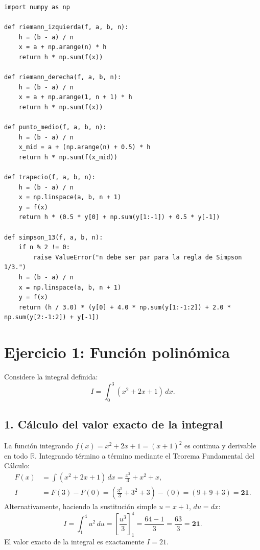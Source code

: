 \documentclass[11pt,a4paper]{article}
\begin{document}
\begin{lstlisting}
import numpy as np

def riemann_izquierda(f, a, b, n):
    h = (b - a) / n
    x = a + np.arange(n) * h
    return h * np.sum(f(x))

def riemann_derecha(f, a, b, n):
    h = (b - a) / n
    x = a + np.arange(1, n + 1) * h
    return h * np.sum(f(x))

def punto_medio(f, a, b, n):
    h = (b - a) / n
    x_mid = a + (np.arange(n) + 0.5) * h
    return h * np.sum(f(x_mid))

def trapecio(f, a, b, n):
    h = (b - a) / n
    x = np.linspace(a, b, n + 1)
    y = f(x)
    return h * (0.5 * y[0] + np.sum(y[1:-1]) + 0.5 * y[-1])

def simpson_13(f, a, b, n):
    if n % 2 != 0:
        raise ValueError("n debe ser par para la regla de Simpson 1/3.")
    h = (b - a) / n
    x = np.linspace(a, b, n + 1)
    y = f(x)
    return (h / 3.0) * (y[0] + 4.0 * np.sum(y[1:-1:2]) + 2.0 * np.sum(y[2:-1:2]) + y[-1])
\end{lstlisting}

\section{Ejercicio 1: Función polinómica}

Considere la integral definida:
\begin{equation}
    I = \int_0^3 (x^2 + 2x + 1)\, dx.
\end{equation}

\subsection{1. Cálculo del valor exacto de la integral}
La función integrando $f(x) = x^2 + 2x + 1 = (x+1)^2$ es continua y derivable en todo $\mathbb{R}$. Integrando término a término mediante el Teorema Fundamental del Cálculo:
\begin{align}
    F(x) &= \int (x^2 + 2x + 1)\, dx = \frac{x^3}{3} + x^2 + x, \\
    I &= F(3) - F(0) = \left( \frac{3^3}{3} + 3^2 + 3 \right) - (0) = \left( 9 + 9 + 3 \right) = \mathbf{21}.
\end{align}
Alternativamente, haciendo la sustitución simple $u = x+1$, $du = dx$:
\begin{equation}
    I = \int_1^4 u^2\, du = \left[ \frac{u^3}{3} \right]_1^4 = \frac{64 - 1}{3} = \frac{63}{3} = \mathbf{21}.
\end{equation}
El valor exacto de la integral es exactamente $I = 21$.
\end{document}
